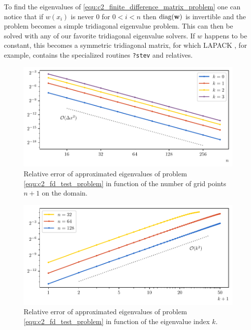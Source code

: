 To find the eigenvalues of \eqref{equ:c2_finite_difference_matrix_problem} one can notice that if $w(x_i)$ is never $0$ for $0 < i < n$ then $\operatorname{diag}(\vb{w})$ is invertible and the problem becomes a simple tridiagonal eigenvalue problem. This can then be solved with any of our favorite tridiagonal eigenvalue solvers. If $w$ happens to be constant, this becomes a symmetric tridiagonal matrix, for which LAPACK \cite{lapack}, for example, contains the specialized routines \texttt{?stev} and relatives.

\begin{figure}
    \begin{center}
        \includegraphics[width=\textwidth]{img/chapter2/finite_difference_h_error.pdf}
    \end{center}
    \caption{Relative error of approximated eigenvalues of problem \eqref{equ:c2_fd_test_problem} in function of the number of grid points $n+1$ on the domain.}
    \label{fig:c2_fd_h_error}
\end{figure}

\begin{figure}
    \begin{center}
        \includegraphics[width=\textwidth]{img/chapter2/finite_difference_k_error.pdf}
    \end{center}
    \caption{Relative error of approximated eigenvalues of problem \eqref{equ:c2_fd_test_problem} in function of the eigenvalue index $k$.}
    \label{fig:c2_fd_k_error}
\end{figure}

